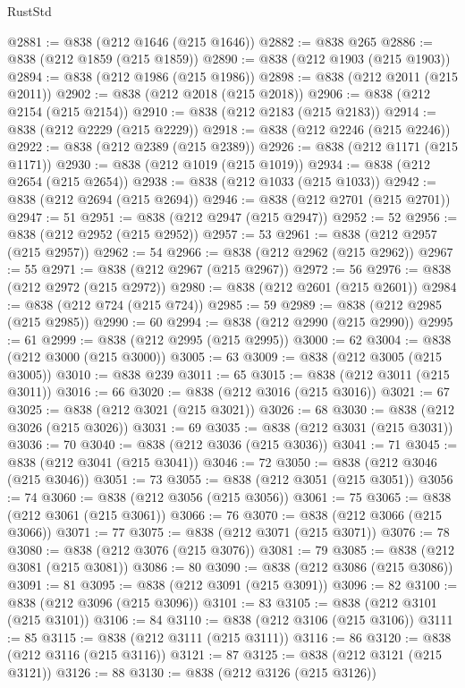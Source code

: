 \begin{lexlean}{RustStd}
\begin{coremodule}
{\begin{coremodule}
{{{{{{{{{{{{{{{{{{{{{{{{{{{{{{{{{{{{{{{{{{{{{{{{{{{{{{{@2881 := @838 (@212 @1646 (@215 @1646))
@2882 := @838 @265
@2886 := @838 (@212 @1859 (@215 @1859))
@2890 := @838 (@212 @1903 (@215 @1903))
@2894 := @838 (@212 @1986 (@215 @1986))
@2898 := @838 (@212 @2011 (@215 @2011))
@2902 := @838 (@212 @2018 (@215 @2018))
@2906 := @838 (@212 @2154 (@215 @2154))
@2910 := @838 (@212 @2183 (@215 @2183))
@2914 := @838 (@212 @2229 (@215 @2229))
@2918 := @838 (@212 @2246 (@215 @2246))
@2922 := @838 (@212 @2389 (@215 @2389))
@2926 := @838 (@212 @1171 (@215 @1171))
@2930 := @838 (@212 @1019 (@215 @1019))
@2934 := @838 (@212 @2654 (@215 @2654))
@2938 := @838 (@212 @1033 (@215 @1033))
@2942 := @838 (@212 @2694 (@215 @2694))
@2946 := @838 (@212 @2701 (@215 @2701))
@2947 := 51
@2951 := @838 (@212 @2947 (@215 @2947))
@2952 := 52
@2956 := @838 (@212 @2952 (@215 @2952))
@2957 := 53
@2961 := @838 (@212 @2957 (@215 @2957))
@2962 := 54
@2966 := @838 (@212 @2962 (@215 @2962))
@2967 := 55
@2971 := @838 (@212 @2967 (@215 @2967))
@2972 := 56
@2976 := @838 (@212 @2972 (@215 @2972))
@2980 := @838 (@212 @2601 (@215 @2601))
@2984 := @838 (@212 @724 (@215 @724))
@2985 := 59
@2989 := @838 (@212 @2985 (@215 @2985))
@2990 := 60
@2994 := @838 (@212 @2990 (@215 @2990))
@2995 := 61
@2999 := @838 (@212 @2995 (@215 @2995))
@3000 := 62
@3004 := @838 (@212 @3000 (@215 @3000))
@3005 := 63
@3009 := @838 (@212 @3005 (@215 @3005))
@3010 := @838 @239
@3011 := 65
@3015 := @838 (@212 @3011 (@215 @3011))
@3016 := 66
@3020 := @838 (@212 @3016 (@215 @3016))
@3021 := 67
@3025 := @838 (@212 @3021 (@215 @3021))
@3026 := 68
@3030 := @838 (@212 @3026 (@215 @3026))
@3031 := 69
@3035 := @838 (@212 @3031 (@215 @3031))
@3036 := 70
@3040 := @838 (@212 @3036 (@215 @3036))
@3041 := 71
@3045 := @838 (@212 @3041 (@215 @3041))
@3046 := 72
@3050 := @838 (@212 @3046 (@215 @3046))
@3051 := 73
@3055 := @838 (@212 @3051 (@215 @3051))
@3056 := 74
@3060 := @838 (@212 @3056 (@215 @3056))
@3061 := 75
@3065 := @838 (@212 @3061 (@215 @3061))
@3066 := 76
@3070 := @838 (@212 @3066 (@215 @3066))
@3071 := 77
@3075 := @838 (@212 @3071 (@215 @3071))
@3076 := 78
@3080 := @838 (@212 @3076 (@215 @3076))
@3081 := 79
@3085 := @838 (@212 @3081 (@215 @3081))
@3086 := 80
@3090 := @838 (@212 @3086 (@215 @3086))
@3091 := 81
@3095 := @838 (@212 @3091 (@215 @3091))
@3096 := 82
@3100 := @838 (@212 @3096 (@215 @3096))
@3101 := 83
@3105 := @838 (@212 @3101 (@215 @3101))
@3106 := 84
@3110 := @838 (@212 @3106 (@215 @3106))
@3111 := 85
@3115 := @838 (@212 @3111 (@215 @3111))
@3116 := 86
@3120 := @838 (@212 @3116 (@215 @3116))
@3121 := 87
@3125 := @838 (@212 @3121 (@215 @3121))
@3126 := 88
@3130 := @838 (@212 @3126 (@215 @3126))
}}}}}}}}}}}}}}}}}}}}}}}}}}}}}}}}}}}}}}}}}}}}}}}}}}}}}}}
\end{coremodule}}
\end{coremodule}
\end{lexlean}
